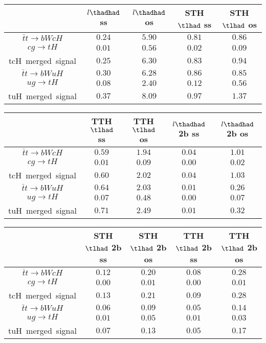 \centering
\begin{tabular}{|c|c|c|c|c|} \hline
 & $l\thadhad$ ss & $l\thadhad$ os & STH $\tlhad$ ss & STH $\tlhad$ os\\\hline
$\bar{t}t\to bWcH$ & $0.24$ & $5.90$ & $0.81$ & $0.86$\\\hline
$cg\to tH$ & $0.01$ & $0.56$ & $0.02$ & $0.09$\\\hline
tcH~merged~signal & $0.25$ & $6.30$ & $0.83$ & $0.94$\\\hline
$\bar{t}t\to bWuH$ & $0.30$ & $6.28$ & $0.86$ & $0.85$\\\hline
$ug\to tH$ & $0.08$ & $2.40$ & $0.12$ & $0.56$\\\hline
tuH~merged~signal & $0.37$ & $8.09$ & $0.97$ & $1.37$\\\hline
\end{tabular}
\begin{tabular}{|c|c|c|c|c|} \hline
 & TTH $\tlhad$ ss & TTH $\tlhad$ os & $l\thadhad$ 2b ss & $l\thadhad$ 2b os\\\hline
$\bar{t}t\to bWcH$ & $0.59$ & $1.94$ & $0.04$ & $1.01$\\\hline
$cg\to tH$ & $0.01$ & $0.09$ & $0.00$ & $0.02$\\\hline
tcH~merged~signal & $0.60$ & $2.02$ & $0.04$ & $1.03$\\\hline
$\bar{t}t\to bWuH$ & $0.64$ & $2.03$ & $0.01$ & $0.26$\\\hline
$ug\to tH$ & $0.07$ & $0.48$ & $0.00$ & $0.07$\\\hline
tuH~merged~signal & $0.71$ & $2.49$ & $0.01$ & $0.32$\\\hline
\end{tabular}
\begin{tabular}{|c|c|c|c|c|} \hline
 & STH $\tlhad$ 2b ss & STH $\tlhad$ 2b os & TTH $\tlhad$ 2b ss & TTH $\tlhad$ 2b os\\\hline
$\bar{t}t\to bWcH$ & $0.12$ & $0.20$ & $0.08$ & $0.28$\\\hline
$cg\to tH$ & $0.00$ & $0.01$ & $0.00$ & $0.01$\\\hline
tcH~merged~signal & $0.13$ & $0.21$ & $0.09$ & $0.28$\\\hline
$\bar{t}t\to bWuH$ & $0.06$ & $0.09$ & $0.05$ & $0.14$\\\hline
$ug\to tH$ & $0.01$ & $0.05$ & $0.01$ & $0.03$\\\hline
tuH~merged~signal & $0.07$ & $0.13$ & $0.05$ & $0.17$\\\hline
\end{tabular}
